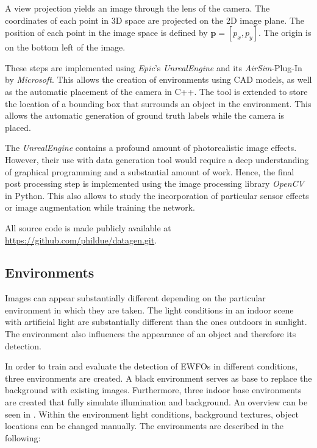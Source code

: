 A view projection yields an image through the lens of the camera. The coordinates of each point in 3D space are projected on the 2D image plane. The position of each point in the image space is defined by $\textbf{p} = [p_x,p_y]$. The origin is on the bottom left of the image.

These steps are implemented using \textit{Epic}'s \textit{UnrealEngine}\cite{unreal} and its \textit{AirSim}-Plug-In\cite{airsim} by \textit{Microsoft}. This allows the creation of environments using \ac{CAD} models, as well as the automatic placement of the camera in C++. The tool is extended to store the location of a bounding box that surrounds an object in the environment. This allows the automatic generation of ground truth labels while the camera is placed.

The \textit{UnrealEngine} contains a profound amount of photorealistic image effects. However, their use with data generation tool would require a deep understanding of graphical programming and a substantial amount of work. Hence, the final post processing step is implemented using the image processing library \textit{OpenCV} in Python. This also allows to study the incorporation of particular sensor effects or image augmentation while training the network.

All source code is made publicly available at \url{https://github.com/phildue/datagen.git}.

\subsection{Environments}
\label{sec:environments}
Images can appear substantially different depending on the particular environment in which they are taken. The light conditions in an indoor scene with artificial light are substantially different than the ones outdoors in sunlight. The environment also influences the appearance of an object and therefore its detection.

In order to train and evaluate the detection of \acp{EWFO} in different conditions, three environments are created. A black environment serves as base to replace the background with existing images. Furthermore, three indoor base environments are created that fully simulate illumination and background. An overview can be seen in . Within the environment light conditions, background textures, object locations can be changed manually. The environments are described in the following:

